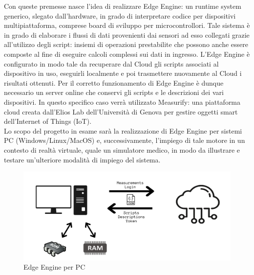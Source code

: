 Con queste premesse nasce l'idea di realizzare Edge Engine: un runtime system generico, slegato dall'hardware, in grado di interpretare codice per dispositivi multipiattaforma, comprese board di sviluppo per microcontrollori. Tale sistema è in grado di elaborare i flussi di dati provenienti dai sensori ad esso collegati grazie all'utilizzo degli script: insiemi di operazioni prestabilite che possono anche essere composte al fine di eseguire calcoli complessi sui dati in ingresso. L'Edge Engine è configurato in modo tale da recuperare dal Cloud gli scripts associati al dispositivo in uso, eseguirli localmente e poi trasmettere nuovamente al Cloud i risultati ottenuti. Per il corretto funzionamento di Edge Engine è dunque necessario un server online che conservi gli scripts e le descrizioni dei vari dispositivi. In questo specifico caso verrà utilizzato Measurify: una piattaforma cloud creata dall'Elios Lab dell'Università di Genova per gestire oggetti smart dell'Internet of Things (IoT).\\
Lo scopo del progetto in esame sarà la realizzazione di Edge Engine per sistemi PC (Windows/Linux/MacOS) e, successivamente, l'impiego di tale motore in un contesto di realtà virtuale, quale un simulatore medico, in modo da illustrare e testare un'ulteriore modalità di impiego del sistema.
\begin{figure}[H]
	\centering
	\includegraphics[width=\linewidth, height= 0.25 \textheight]{pics/edgine}
	\caption{Edge Engine per PC}
	\label{edgine}
\end{figure}